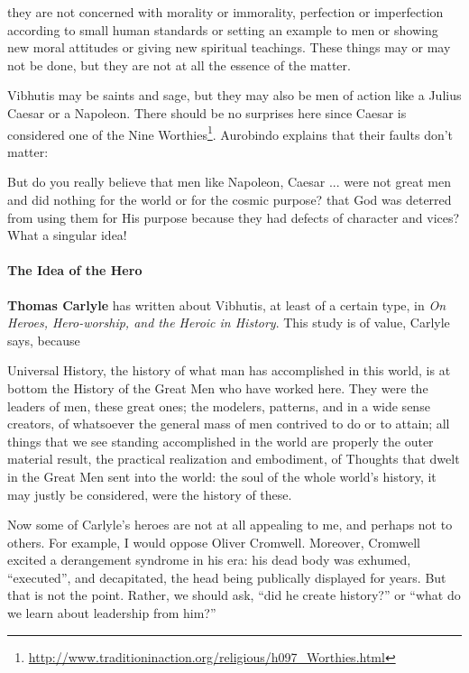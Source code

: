 \begin{quotex}
they are not concerned with morality or immorality, perfection or imperfection according to small human standards or setting an example to men or showing new moral attitudes or giving new spiritual teachings. These things may or may not be done, but they are not at all the essence of the matter.
\end{quotex}


Vibhutis may be saints and sage, but they may also be men of action like a Julius Caesar or a Napoleon. There should be no surprises here since Caesar is considered one of the Nine Worthies\footnote{\url{http://www.traditioninaction.org/religious/h097_Worthies.html}}. Aurobindo explains that their faults don't matter:

\begin{quotex}
But do you really believe that men like Napoleon, Caesar ... were not great men and did nothing for the world or for the cosmic purpose? that God was deterred from using them for His purpose because they had defects of character and vices? What a singular idea!
\end{quotex}


\paragraph{The Idea of the Hero}


\textbf{Thomas Carlyle} has written about Vibhutis, at least of a certain type, in \emph{On Heroes, Hero-worship, and the Heroic in History}. This study is of value, Carlyle says, because

\begin{quotex}
Universal History, the history of what man has accomplished in this world, is at bottom the History of the Great Men who have worked here. They were the leaders of men, these great ones; the modelers, patterns, and in a wide sense creators, of whatsoever the general mass of men contrived to do or to attain; all things that we see standing accomplished in the world are properly the outer material result, the practical realization and embodiment, of Thoughts that dwelt in the Great Men sent into the world: the soul of the whole world's history, it may justly be considered, were the history of these.
\end{quotex}


Now some of Carlyle's heroes are not at all appealing to me, and perhaps not to others. For example, I would oppose Oliver Cromwell. Moreover, Cromwell excited a derangement syndrome in his era: his dead body was exhumed, ``executed'', and decapitated, the head being publically displayed for years. But that is not the point. Rather, we should ask, ``did he create history?'' or ``what do we learn about leadership from him?''

